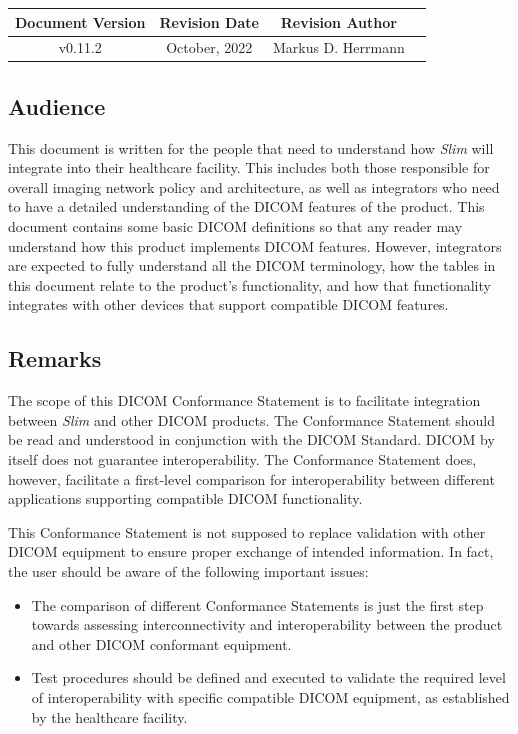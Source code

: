 \documentclass[12pt, letterpaper]{article}
\begin{document}
\begin{table}
    \begin{tabular}{ |c|c|c|c| }
        \hline
        Document Version & Revision Date & Revision Author\\
        \hline
        v0.11.2 & October, 2022 & Markus D. Herrmann \\
        \hline
    \end{tabular}
\end{table}

\subsection{Audience}

This document is written for the people that need to understand how \emph{Slim} will integrate into their healthcare facility.
This includes both those responsible for overall imaging network policy and architecture, as well as integrators who need to have a detailed understanding of the \gls{DICOM} features of the product.
This document contains some basic \gls{DICOM} definitions so that any reader may understand how this product implements \gls{DICOM} features.
However, integrators are expected to fully understand all the \gls{DICOM} terminology, how the tables in this document relate to the product's functionality, and how that functionality integrates with other devices that support compatible \gls{DICOM} features.

\subsection{Remarks}

The scope of this \gls{DICOM} Conformance Statement is to facilitate integration between \emph{Slim} and other \gls{DICOM} products.
The Conformance Statement should be read and understood in conjunction with the \gls{DICOM} Standard.
\gls{DICOM} by itself does not guarantee interoperability.
The Conformance Statement does, however, facilitate a first-level comparison for interoperability between different applications supporting compatible \gls{DICOM} functionality.

This Conformance Statement is not supposed to replace validation with other \gls{DICOM} equipment to ensure proper exchange of intended information.
In fact, the user should be aware of the following important issues:

\begin{itemize}
    \item The comparison of different Conformance Statements is just the first step towards assessing interconnectivity and interoperability between the product and other \gls{DICOM} conformant equipment.

    \item Test procedures should be defined and executed to validate the required level of interoperability with specific compatible \gls{DICOM} equipment, as established by the healthcare facility.
\end{itemize}
\end{document}
